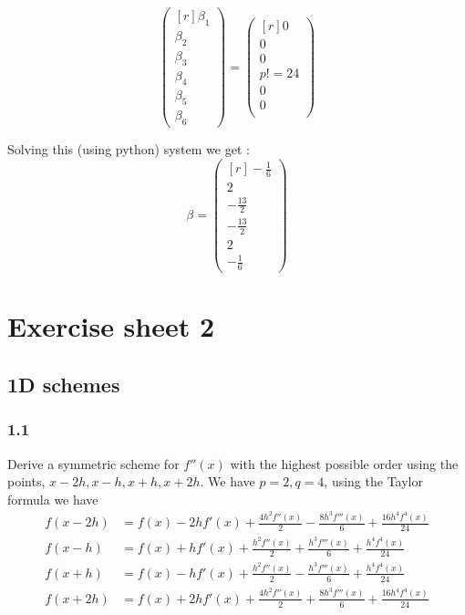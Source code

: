 \begin{exmp}
\[  \begin{pmatrix*}[r]
      \beta_1 \\
       \beta_2\\
       \beta_3\\
       \beta_4\\
       \beta_5\\
       \beta_6
  \end{pmatrix*}
   = \begin{pmatrix*}[r]
       0  \\
        0\\
        0\\
        p! = 24\\
        0\\
        0\\
   \end{pmatrix*} 
   \]

   Solving this (using python) system we get : 
   \[
   \beta = 
   \begin{pmatrix*}[r]
       - \frac{ 1 }{ 6 }  \\[.5em]
        2 \\[.5em]
        - \frac{ 13 }{ 2 } \\[.5em]
        - \frac{ 13 }{ 2 } \\[.5em]
        2\\[.5em]
        - \frac{ 1 }{ 6 } 
   \end{pmatrix*}
   \]
\end{exmp}



\section{Exercise sheet 2}
\label{sec:Exercise sheet 2}
\subsection{1D schemes}
\label{subsec:1D schemes}
\subsubsection{1.1}
Derive a symmetric scheme for $ f''(x) $ with the highest possible order using the points,
$ x-2h, x-h, x+h, x+2h $. 
We have $ p = 2, q = 4 $, using the Taylor formula we have 
\begin{align*}
        f(x-2h) &= f(x) - 2hf'(x) + \frac{ 4h^2f''(x)  }{ 2 } - \frac{ 8h^3f'''(x)  }{ 6 } +
        \frac{ 16h^4f^{4}(x)  }{ 24 } \\ 
        f(x-h) &= f(x) + hf'(x) + \frac{ h^2f''(x)  }{ 2 } + \frac{ h^3f'''(x)  }{ 6 } +
        \frac{ h^4f^{4}(x)  }{ 24 } \\ 
        f(x+h) &= f(x) - hf'(x) + \frac{ h^2f''(x)  }{ 2 } - \frac{ h^3f'''(x)  }{ 6 } +
        \frac{ h^4f^{4}(x)  }{ 24 } \\ 
        f(x+2h) &= f(x) + 2hf'(x) + \frac{ 4h^2f''(x)  }{ 2 } + \frac{ 8h^3f'''(x)  }{ 6 } +
        \frac{ 16h^4f^{4}(x)  }{ 24 }  
\end{align*}

